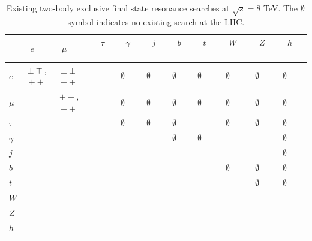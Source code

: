\begin{table}
\caption{ Existing two-body exclusive final state resonance searches at $\sqrt{s}=8$ TeV.  The $\emptyset$ symbol indicates no existing search at the LHC.}
\begin{tabular}{lccccccccccc}
\hline
\hline
 & $e$\ \   & $\mu$\ \   & \ \  $\tau$\ \   & \ \  $\gamma$\ \   & \ \  $j$ \ \   & \ \  $b$\ \  & \ \ $t$ \ \ & \ \ $W$ \ \ & \ \ $Z$ \ \ & \ \ $h$ \ \   \\
\hline
$e$ & $\pm\mp$\cite{atlasdilepton8tev},$\pm\pm$\cite{atlassslep8tev} & $\pm\pm$\cite{atlassslep8tev,Khachatryan:2016ovq} $\pm\mp$\cite{Aad:2015pfa,Khachatryan:2016ovq}  & \cite{Aad:2015pfa} & $\emptyset$  & $\emptyset$ & $\emptyset$& $\emptyset$& $\emptyset$& $\emptyset$& $\emptyset$\\
$\mu$ & & $\pm\mp$\cite{atlasdilepton8tev},$\pm\pm$\cite{atlassslep8tev} &   \cite{Aad:2015pfa}& $\emptyset$ & $\emptyset$ & $\emptyset$ & $\emptyset$& $\emptyset$& $\emptyset$& $\emptyset$\\
$\tau$ & & & \cite{atlastautau8tev} & $\emptyset$ & $\emptyset$ & $\emptyset$ & \cite{Khachatryan:2015bsa}& $\emptyset$& $\emptyset$& $\emptyset$\\
$\gamma$ & & & & \cite{atlasdiphoton8tev} & \cite{cmsphotonjet8tev,atlasphotonjet8tev,Aad:2015ywd} & $\emptyset$ & $\emptyset$ & \cite{Aad:2014fha} & \cite{Aad:2014fha} & $\emptyset$\\
$j$ & & & & & \cite{atlasdijet8tev} & \cite{CMS-PAS-EXO-12-023} & \cite{Aad:2012em} & \cite{Khachatryan:2014hpa}  & \cite{Khachatryan:2014hpa}  & $\emptyset$\\
$b$  &  & & & &  & \cite{CMS-PAS-EXO-12-023} & \cite{Aad:2015typ} & $\emptyset$ & $\emptyset$  & $\emptyset$\\
$t$ &  & & & & &  & \cite{Aad:2015fna} & \cite{Aad:2015voa} & $\emptyset$  & $\emptyset$\\
$W$ &  & & & & &  &  & \cite{Aad:2015agg,Aad:2015owa,Aad:2015ufa,Khachatryan:2014gha} & \cite{Aad:2015owa,Aad:2015ufa,Khachatryan:2014xja,Aad:2015ipg} & \cite{Aad:2015yza,Khachatryan:2016yji,Khachatryan:2015bma} \\
$Z$ &  & & & & &  & & & \cite{Aad:2015kna,Aad:2015owa,Khachatryan:2014gha} & \cite{Aad:2015yza,Khachatryan:2015lba,Khachatryan:2015ywa,Khachatryan:2015bma}  \\
$h$ &  & & & &  &  & & & & \cite{Aad:2015xja,Khachatryan:2015yea, CMS-PAS-EXO-15-008, Khachatryan:2016cfa} \\

\hline
\hline
\end{tabular}
\label{tab:res}
\end{table}

